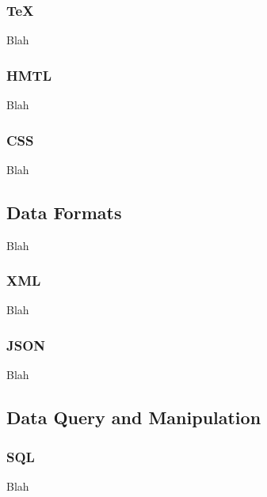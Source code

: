 \subsubsection{TeX}

Blah

\subsubsection{HMTL}

Blah

\subsubsection{CSS}

Blah


\subsection{Data Formats}

Blah

\subsubsection{XML}

Blah

\subsubsection{JSON}

Blah


\subsection{Data Query and Manipulation}

\subsubsection{SQL}


Blah \\
